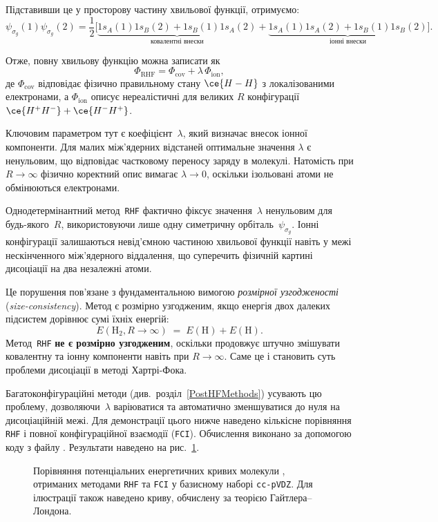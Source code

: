 Підставивши це у просторову частину хвильової функції, отримуємо:
\[
	\psi_{\sigma_g}(1)\psi_{\sigma_g}(2)
	= \frac{1}{2}
	\Big[
	\underbrace{
		1s_A(1)1s_B(2) + 1s_B(1)1s_A(2)
	}_{\text{ковалентні внески}}
	+
	\underbrace{
		1s_A(1)1s_A(2) + 1s_B(1)1s_B(2)
	}_{\text{іонні внески}}
	\Big].
\]

Отже, повну хвильову функцію можна записати як
\[
	\Phi_{\text{RHF}} = \Phi_{\mathrm{cov}} + \lambda\,\Phi_{\mathrm{ion}},
\]
де $\Phi_{\mathrm{cov}}$ відповідає фізично правильному стану
\(\ce{H - H}\) з локалізованими електронами,
а $\Phi_{\mathrm{ion}}$ описує нереалістичні для великих $R$
конфігурації~$\ce{H^+H^-} + \ce{H^-H^+}$.

Ключовим параметром тут є коефіцієнт~$\lambda$, який визначає
внесок іонної компоненти. Для малих між'ядерних відстаней
оптимальне значення $\lambda$ є ненульовим, що відповідає
частковому переносу заряду в молекулі. Натомість при $R\to\infty$
фізично коректний опис вимагає $\lambda \to 0$, оскільки
ізольовані атоми не обмінюються електронами.

Однодетермінантний метод~\texttt{RHF} фактично фіксує
значення~$\lambda$ ненульовим для будь-якого~$R$, використовуючи
лише одну симетричну орбіталь~$\psi_{\sigma_g}$. Іонні конфігурації
залишаються невід'ємною частиною хвильової функції навіть у межі
нескінченного між'ядерного віддалення, що суперечить фізичній картині
дисоціації на два незалежні атоми.

Це порушення пов'язане з фундаментальною вимогою \emph{розмірної узгодженості}
(\emph{size-consistency}). Метод є розмірно узгодженим, якщо
енергія двох далеких підсистем дорівнює сумі їхніх енергій:
\[
	E(\text{H}_2, R\!\to\!\infty) \;=\; E(\text{H}) + E(\text{H}).
\]
Метод~\texttt{RHF} \textbf{не є розмірно узгодженим}, оскільки
продовжує штучно змішувати ковалентну та іонну компоненти навіть
при $R\to\infty$. Саме це і становить суть проблеми дисоціації
в методі Хартрі-Фока.

Багатоконфігураційні методи (див.~розділ~\ref{PostHFMethods})
усувають цю проблему, дозволяючи~$\lambda$ варіюватися
та автоматично зменшуватися до нуля на дисоціаційній межі.
Для демонстрації цього нижче наведено кількісне порівняння
\texttt{RHF} і повної конфігураційної взаємодії (\texttt{FCI}).
Обчислення виконано за допомогою коду з файлу
.
Результати наведено на рис.~\ref{pic:h2_complete_comparison}.


\begin{figure}[h!]\centering
	
	\caption{Порівняння потенціальних енергетичних кривих молекули , отриманих методами \texttt{RHF} та \texttt{FCI} у базисному наборі \texttt{cc-pVDZ}. Для ілюстрації також наведено криву, обчислену за теорією Гайтлера–Лондона.}
	\label{pic:h2_complete_comparison}
\end{figure}

